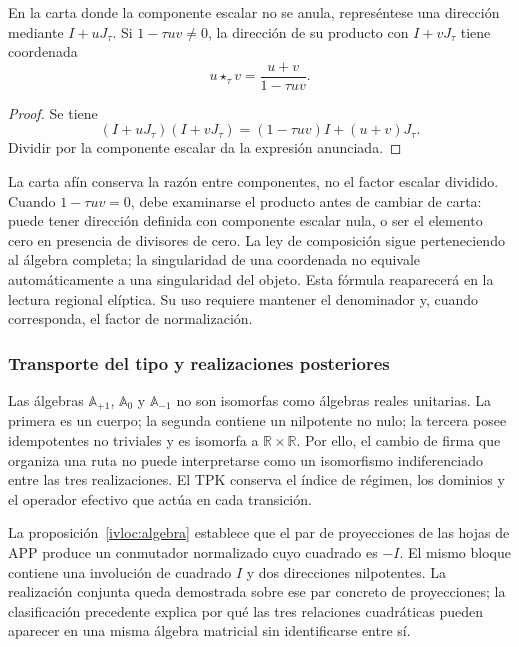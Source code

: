 \begin{proposition}
\label{trit-ampl-prop-pendientes}
En la carta donde la componente escalar no se anula, represéntese una
dirección mediante \(I+uJ_\tau\). Si \(1-\tau uv\ne0\), la dirección de su
producto con \(I+vJ_\tau\) tiene coordenada
\[
 u\star_\tau v=\frac{u+v}{1-\tau uv}.
\]
\end{proposition}
\begin{proof}
Se tiene
\[
 (I+uJ_\tau)(I+vJ_\tau)
   =(1-\tau uv)I+(u+v)J_\tau.
\]
Dividir por la componente escalar da la expresión anunciada.
\end{proof}

La carta afín conserva la razón entre componentes, no el factor escalar
dividido. Cuando \(1-\tau uv=0\), debe examinarse el producto antes de
cambiar de carta: puede tener dirección definida con componente escalar
nula, o ser el elemento cero en presencia de divisores de cero. La ley de
composición sigue perteneciendo al álgebra completa; la singularidad de
una coordenada no equivale automáticamente a una singularidad del objeto.
Esta fórmula reaparecerá en la lectura regional elíptica. Su uso requiere
mantener el denominador y, cuando corresponda, el factor de normalización.

\subsubsection{Transporte del tipo y realizaciones posteriores}
\label{trit-ampl-puentes}

Las álgebras \(\mathbb A_{+1}\), \(\mathbb A_0\) y
\(\mathbb A_{-1}\) no son isomorfas como álgebras reales unitarias.
La primera es un cuerpo; la segunda contiene un nilpotente no nulo; la
tercera posee idempotentes no triviales y es isomorfa a
\(\mathbb R\times\mathbb R\). Por ello, el cambio de firma que organiza una
ruta no puede interpretarse como un isomorfismo indiferenciado entre las
tres realizaciones. El TPK conserva el índice de régimen, los dominios y el
operador efectivo que actúa en cada transición.



La proposición~\ref{ivloc:algebra} establece que el par de proyecciones de las hojas de APP
produce un conmutador normalizado cuyo cuadrado es \(-I\). El mismo bloque
contiene una involución de cuadrado \(I\) y dos direcciones nilpotentes. La
realización conjunta queda demostrada sobre ese par concreto de proyecciones;
la clasificación precedente explica por qué las tres relaciones cuadráticas
pueden aparecer en una misma álgebra matricial sin identificarse entre sí.

